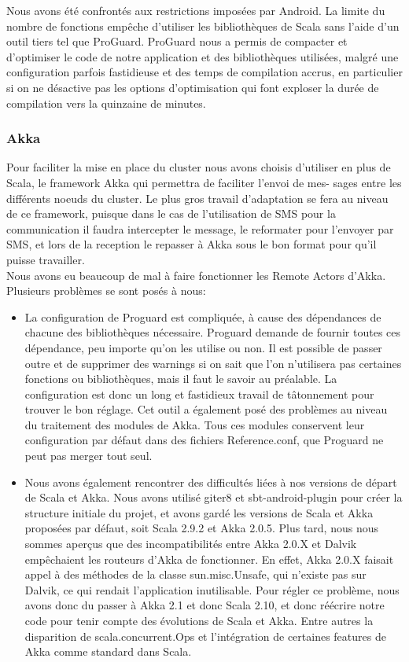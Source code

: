 \documentclass[a4paper,12pt]{article}
\begin{document}
Nous avons été confrontés aux restrictions imposées par Android. La limite du
nombre de fonctions empêche d’utiliser les bibliothèques de Scala sans l’aide
d’un outil tiers tel que ProGuard. ProGuard nous a permis de compacter et
d’optimiser le code de notre application et des bibliothèques utilisées, malgré
une configuration parfois fastidieuse et des temps de compilation accrus, en
particulier si on ne désactive pas les options d’optimisation qui font exploser
la durée de compilation vers la quinzaine de minutes.

\subsubsection{Akka}
Pour faciliter la mise en place du cluster nous avons choisis d'utiliser en
plus de Scala, le framework Akka qui permettra de faciliter l'envoi de mes-
sages entre les différents noeuds du cluster. Le plus gros travail d'adaptation
se fera au niveau de ce framework, puisque dans le cas de l'utilisation de SMS
pour la communication il faudra intercepter le message, le reformater pour
l'envoyer par SMS, et lors de la reception le repasser à Akka
sous le bon format pour qu'il puisse travailler.\\


Nous avons eu beaucoup de mal à faire fonctionner les Remote Actors d’Akka.
Plusieurs problèmes se sont posés à nous:\\
\begin{itemize}
\item La configuration de Proguard est compliquée, à cause des dépendances de
  chacune des bibliothèques nécessaire. Proguard demande de fournir toutes ces
  dépendance, peu importe qu’on les utilise ou non. Il est possible de passer
  outre et de supprimer des warnings si on sait que l’on n’utilisera pas
  certaines fonctions ou bibliothèques, mais il faut le savoir au préalable. La
  configuration est donc un long et fastidieux travail de tâtonnement pour
  trouver le bon réglage. Cet outil a également posé des problèmes au niveau
  du traitement des modules de Akka. Tous ces modules conservent leur
  configuration par défaut dans des fichiers Reference.conf, que Proguard ne
  peut pas merger tout seul.\\
\item Nous avons également rencontrer des difficultés liées à nos versions de
  départ de Scala et Akka. Nous avons utilisé giter8 et sbt-android-plugin pour
  créer la structure initiale du projet, et avons gardé les versions de Scala
  et Akka proposées par défaut, soit Scala 2.9.2 et Akka 2.0.5. Plus tard, nous
  nous sommes aperçus que des incompatibilités entre Akka 2.0.X et Dalvik
  empêchaient les routeurs d’Akka de fonctionner. En effet, Akka 2.0.X faisait
  appel à des méthodes de la classe sun.misc.Unsafe, qui n’existe pas sur
  Dalvik, ce qui rendait l’application inutilisable. Pour régler ce problème,
  nous avons donc du passer à Akka 2.1 et donc Scala 2.10, et donc réécrire
  notre code pour tenir compte des évolutions de Scala et Akka. Entre autres la
  disparition de scala.concurrent.Ops et l’intégration de certaines features de
  Akka comme standard dans Scala.
\end{itemize}
\end{document}
